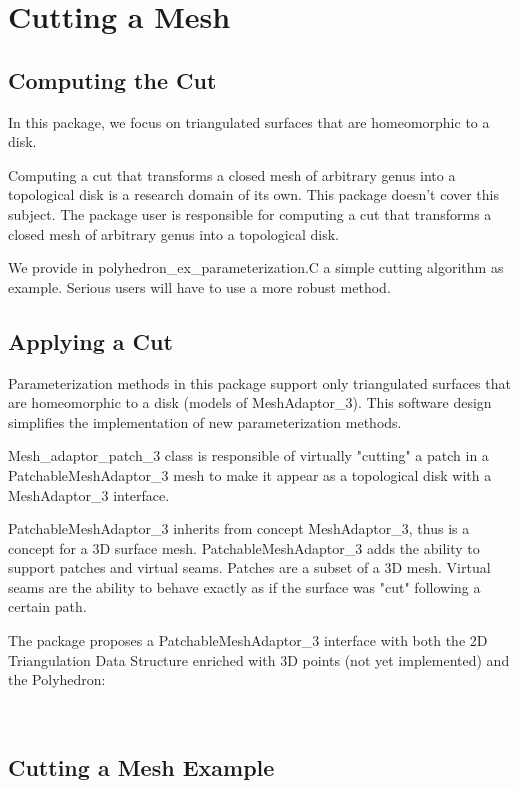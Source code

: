 \section{Cutting a Mesh}

\subsection{Computing the Cut}

In this
package, we focus on triangulated surfaces that are homeomorphic to a
disk.

Computing a cut that transforms
a closed mesh of arbitrary genus into a topological disk is a research domain
of its own. This package doesn't cover this subject.
The package user is responsible for computing a cut that transforms
a closed mesh of arbitrary genus into a topological disk.

We provide in polyhedron\_ex\_parameterization.C a simple cutting algorithm as example.
Serious users will have to use a more robust method.


\subsection{Applying a Cut}

Parameterization methods in this package support only
triangulated surfaces that are homeomorphic to a
disk (models of MeshAdaptor\_3). This software design simplifies the implementation of new
parameterization methods.

Mesh\_adaptor\_patch\_3 class is responsible of virtually "cutting"
a patch in a PatchableMeshAdaptor\_3 mesh to make it appear as a topological disk
with a MeshAdaptor\_3 interface.

PatchableMeshAdaptor\_3 inherits from concept MeshAdaptor\_3, thus is a concept for a 3D surface mesh.
PatchableMeshAdaptor\_3 adds the ability to support patches and virtual seams. Patches are a subset of a 3D mesh. Virtual seams are the ability to behave exactly as if the surface was "cut" following a certain path.

The package proposes
a PatchableMeshAdaptor\_3 interface with both the 2D Triangulation Data Structure enriched
with 3D points (not yet implemented) and the Polyhedron:

  \\


\subsection{Cutting a Mesh Example}

